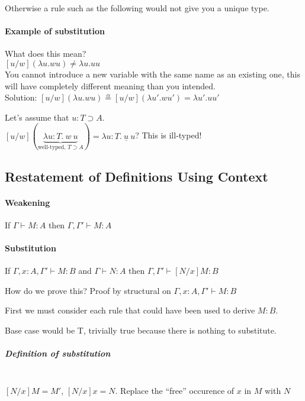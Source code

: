 \documentclass[12 pt]{article}
\begin{document}
\begin{prooftree}
\end{prooftree}

Otherwise a rule such as the following would not give you
a unique type.
\begin{prooftree}
\end{prooftree}
\paragraph{Example of substitution} What does this mean?
\\ $[u/w] (\lambda u.w u) \neq \lambda u. u u$
\\ You cannot introduce a new variable with the same name as an
existing one, this will have completely different meaning than you
intended.
\\ Solution: $[u/w](\lambda u. w
	u)\stackrel{\alpha}{=}[u/w](\lambda u'. w u') = \lambda u'. u u'$

Let's assume that $u : T \supset A$.
\\ $[u/w](\underbrace{\lambda u : T. \ w \ u}_{\text{well-typed, $T
			\supset A$}}) = \lambda u : T. \ \underline{u} \ u$? This is
ill-typed!
\subsection{Restatement of Definitions Using Context}
\paragraph{Weakening} If $\Gamma \vdash M:A$ then $\Gamma, \Gamma'
	\vdash M:A$
\paragraph{Substitution} If $\Gamma, x : A , \Gamma' \vdash M : B$
and $\Gamma \vdash N : A$ then $\Gamma, \Gamma' \vdash [N/x] M : B$

How do we prove this? Proof by structural on $\Gamma, x: A,
	\Gamma' \vdash M : B$

First we must consider each rule that could have been used to derive
$M : B$.

Base case would be T, trivially true because there is nothing to
substitute.

\subparagraph{Definition of substitution}
~\\$[N/x]M = M'$, $[N/x] x = N$. Replace the ``free'' occurence of
$x$ in $M$ with $N$
\end{document}
